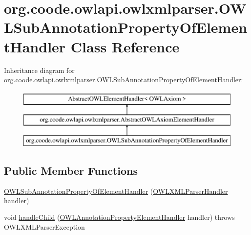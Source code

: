 \hypertarget{classorg_1_1coode_1_1owlapi_1_1owlxmlparser_1_1_o_w_l_sub_annotation_property_of_element_handler}{\section{org.\-coode.\-owlapi.\-owlxmlparser.\-O\-W\-L\-Sub\-Annotation\-Property\-Of\-Element\-Handler Class Reference}
\label{classorg_1_1coode_1_1owlapi_1_1owlxmlparser_1_1_o_w_l_sub_annotation_property_of_element_handler}
}
Inheritance diagram for org.\-coode.\-owlapi.\-owlxmlparser.\-O\-W\-L\-Sub\-Annotation\-Property\-Of\-Element\-Handler\-:\begin{figure}[H]
\begin{center}
\leavevmode
\includegraphics[height=3.000000cm]{classorg_1_1coode_1_1owlapi_1_1owlxmlparser_1_1_o_w_l_sub_annotation_property_of_element_handler}
\end{center}
\end{figure}
\subsection*{Public Member Functions}
\begin{DoxyCompactItemize}
\item 
\hyperlink{classorg_1_1coode_1_1owlapi_1_1owlxmlparser_1_1_o_w_l_sub_annotation_property_of_element_handler_ac71221315cd1fcf78c1bb4d1a459b913}{O\-W\-L\-Sub\-Annotation\-Property\-Of\-Element\-Handler} (\hyperlink{classorg_1_1coode_1_1owlapi_1_1owlxmlparser_1_1_o_w_l_x_m_l_parser_handler}{O\-W\-L\-X\-M\-L\-Parser\-Handler} handler)
\item 
void \hyperlink{classorg_1_1coode_1_1owlapi_1_1owlxmlparser_1_1_o_w_l_sub_annotation_property_of_element_handler_ab80fe261c9488f22eae2a5cc089bd70c}{handle\-Child} (\hyperlink{classorg_1_1coode_1_1owlapi_1_1owlxmlparser_1_1_o_w_l_annotation_property_element_handler}{O\-W\-L\-Annotation\-Property\-Element\-Handler} handler)  throws O\-W\-L\-X\-M\-L\-Parser\-Exception 
\end{DoxyCompactItemize}
